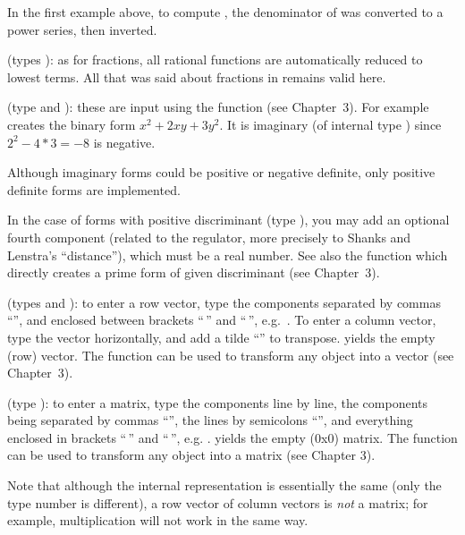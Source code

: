 In the first example above, to compute , the denominator of
 was converted to a power series, then inverted.

(types ): as for fractions, all rational
functions are automatically reduced to lowest terms. All that was
said about fractions in  remains valid here.

%
(type  and ):
these are input using the function  (see Chapter~3). For example
 creates the binary form $x^2+2xy+3y^2$. It is imaginary (of
internal type ) since $2^2 - 4*3 = -8$ is negative.

Although imaginary forms could be positive or negative definite, only
positive definite forms are implemented.

In the case of forms with positive discriminant (type ), you may add
an optional fourth component (related to the regulator, more precisely to
Shanks and Lenstra's ``distance''), which must be a real number. See also the
function  which directly creates a prime form of given
discriminant (see Chapter~3).

 (types
 and ): to enter a row vector, type the components
separated by commas ``\kbd{,}'', and enclosed between brackets
``\kbd{[}$\,$'' and ``$\,$\kbd{]}'', e.g.~\kbd{[1,2,3]}. To enter a column
vector, type the vector horizontally, and add a tilde ``\til'' to transpose.
\kbd{[ ]} yields the empty (row) vector. The function  can be used
to transform any object into a vector (see Chapter~3).

 (type ): to enter a matrix, type
the components line by line, the components being separated by commas
``\kbd{,}'', the lines by semicolons ``\kbd{;}'', and everything enclosed in
brackets ``\kbd{[}$\,$'' and ``$\,$\kbd{]}'', e.g. \kbd{[x,y; z,t; u,v]}.
\kbd{[ ; ]} yields the empty (0x0) matrix. The function  can be used
to transform any object into a matrix (see Chapter 3).

Note that although the internal representation is essentially the same (only
the type number is different), a row vector of column vectors is \emph{not} a
matrix; for example, multiplication will not work in the same way.

